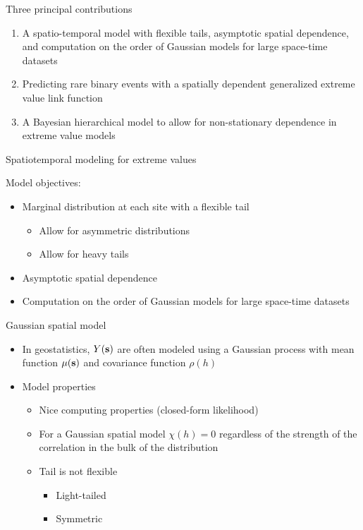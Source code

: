 \documentclass{beamer}
\begin{document}
\begin{frame}{Three principal contributions}
\begin{adjustwidth}{1em}{0em}
  \begin{enumerate}[1.] \setlength{\itemsep}{1.5em}
    \item A spatio-temporal model with flexible tails, asymptotic spatial dependence, and computation on the order of Gaussian models for large space-time datasets
    \item Predicting rare binary events with a spatially dependent generalized extreme value link function
    \item A Bayesian hierarchical model to allow for non-stationary dependence in extreme value models
  \end{enumerate}
\end{adjustwidth}
\end{frame}

\begin{frame}{Spatiotemporal modeling for extreme values}
\begin{adjustwidth}{1em}{0em}
  Model objectives: \vspace{1em}
  \begin{itemize} \setlength{\itemsep}{1em} \setlength{\itemindent}{1em}
    \item Marginal distribution at each site with a flexible tail
    \begin{itemize}
      \item Allow for asymmetric distributions
      \item Allow for heavy tails
    \end{itemize}
    \item Asymptotic spatial dependence
    \item Computation on the order of Gaussian models for large space-time datasets
  \end{itemize}
\end{adjustwidth}
\end{frame}

\begin{frame}{Gaussian spatial model}
  \begin{itemize} \setlength{\itemsep}{1em}
    \item In geostatistics, $Y(\mbox{\bf s})$ are often modeled using a Gaussian process with mean function $\mu(\mbox{\bf s})$ and covariance function $\rho(h)$
    \item Model properties
    \begin{itemize}
      \item Nice computing properties (closed-form likelihood)
      \item For a Gaussian spatial model $\chi(h) = 0$ regardless of the strength of the correlation in the bulk of the distribution
      \item Tail is not flexible
      \begin{itemize}
        \item Light-tailed
        \item Symmetric
      \end{itemize}
    \end{itemize}
  \end{itemize}
\end{frame}
\end{document}
